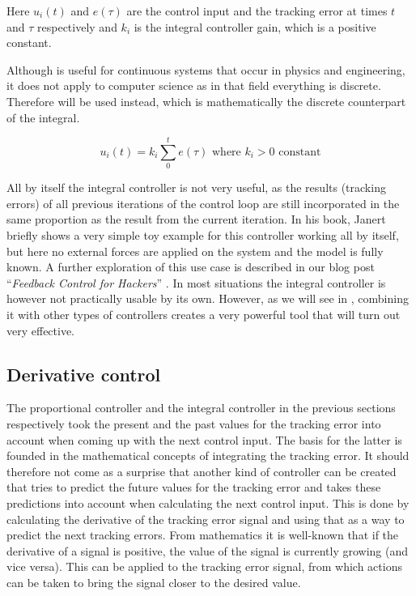 Here $u_i(t)$ and $e(\tau)$ are the control input and the tracking error at times $t$ and $\tau$ respectively and $k_i$ is the integral controller gain, which is a positive constant.

Although  is useful for continuous systems that occur in physics and engineering, it does not apply to computer science as in that field everything is discrete. Therefore  will be used instead, which is mathematically the discrete counterpart of the integral.

\begin{equation}\label{eq:integral-control-discrete}
u_i(t) = k_i \sum_{0}^{t}e(\tau) \text{\ \ \ \ where } k_i > 0 \text{ constant}
\end{equation}

All by itself the integral controller is not very useful, as the results (tracking errors) of all previous iterations of the control loop are still incorporated in the same proportion as the result from the current iteration. In his book, Janert \cite{janert2013-feedback} briefly shows a very simple toy example for this controller working all by itself, but here no external forces are applied on the system and the model is fully known. A further exploration of this use case is described in our blog post ``\textit{Feedback Control for Hackers}'' \cite{heest2015-feedback-for-hackers}. In most situations the integral controller is however not practically usable by its own. However, as we will see in , combining it with other types of controllers creates a very powerful tool that will turn out very effective.

\subsection{Derivative control}
The proportional controller and the integral controller in the previous sections respectively took the present and the past values for the tracking error into account when coming up with the next control input. The basis for the latter is founded in the mathematical concepts of integrating the tracking error. It should therefore not come as a surprise that another kind of controller can be created that tries to predict the future values for the tracking error and takes these predictions into account when calculating the next control input. This is done by calculating the derivative of the tracking error signal and using that as a way to predict the next tracking errors. From mathematics it is well-known that if the derivative of a signal is positive, the value of the signal is currently growing (and vice versa). This can be applied to the tracking error signal, from which actions can be taken to bring the signal closer to the desired value.

